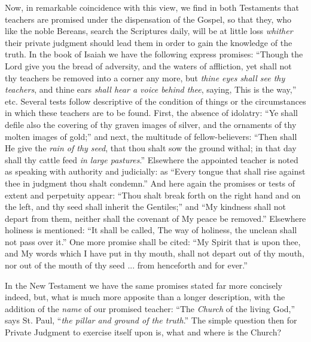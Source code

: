 Now, in remarkable coincidence with this view, we find in both
Testaments that teachers are promised under the dispensation of the
Gospel, so that they, who like the noble Bereans, search the
Scriptures daily, will be at little loss \emph{whither} their private
judgment should lead them in order to gain the knowledge of the truth.
In the book of Isaiah we have the following express promises:
``Though the Lord give you the bread of adversity, and the waters
of affliction, yet shall not thy teachers be removed into a corner any
more, but \emph{thine eyes shall see thy teachers}, and thine ears \emph{shall
hear a voice behind thee}, saying, This is the way,'' etc.
Several tests follow descriptive of the condition of things or the
circumstances in which these teachers are to be found. First, the
absence of idolatry: ``Ye shall defile also the covering of thy
graven images of silver, and the ornaments of thy molten images of
gold;'' and next, the multitude of fellow-believers: ``Then
shall He give the \emph{rain of thy seed}, that thou shalt sow the
ground withal; in that day shall thy cattle feed \emph{in large pastures}.''
Elsewhere the appointed teacher is noted as speaking with authority
and judicially: as ``Every tongue that shall rise against thee in
judgment thou shalt condemn.'' And here again the promises or
tests of extent and perpetuity appear: ``Thou shalt break forth on
the right hand and on the left, and thy seed shall inherit the
Gentiles;'' and ``My kindness shall not depart from them,
neither shall the covenant of My peace be removed.'' Elsewhere
holiness is mentioned: ``It shall be called, The way of holiness,
the unclean shall not pass over it.'' One more promise shall be
cited: ``My Spirit that is upon thee, and My words which I
have put in thy mouth, shall not depart out of thy mouth, nor out of
the mouth of thy seed ... from henceforth and for ever.''

In the New Testament we have the same promises stated far more
concisely indeed, but, what is much more apposite than a longer
description, with the addition of the \emph{name} of our promised
teacher: ``The \emph{Church} of the living God,'' says St.
Paul, ``\emph{the pillar and ground of the truth}.'' The
simple question then for Private Judgment to exercise itself upon is,
what and where is the Church?

